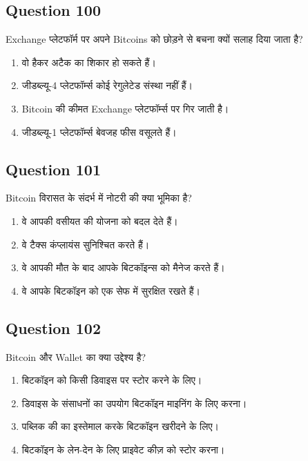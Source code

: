 \documentclass[12pt,a4paper]{article}
\begin{document}
\bigskip


\subsection*{Question 100}
Exchange प्लेटफॉर्म पर अपने Bitcoins को छोड़ने से बचना क्यों सलाह दिया जाता है?

\begin{enumerate}[label=\Alph*., leftmargin=*]
\item वो हैकर अटैक का शिकार हो सकते हैं।
\item जीडब्ल्यू-4 प्लेटफॉर्म्स कोई रेगुलेटेड संस्था नहीं हैं।
\item Bitcoin की कीमत Exchange प्लेटफॉर्म्स पर गिर जाती है।
\item जीडब्ल्यू-1 प्लेटफॉर्म्स बेवजह फीस वसूलते हैं।
\end{enumerate}

\bigskip


\subsection*{Question 101}
Bitcoin विरासत के संदर्भ में नोटरी की क्या भूमिका है?

\begin{enumerate}[label=\Alph*., leftmargin=*]
\item वे आपकी वसीयत की योजना को बदल देते हैं।
\item वे टैक्स कंप्लायंस सुनिश्चित करते हैं।
\item वे आपकी मौत के बाद आपके बिटकॉइन्स को मैनेज करते हैं।
\item वे आपके बिटकॉइन को एक सेफ में सुरक्षित रखते हैं।
\end{enumerate}

\bigskip


\subsection*{Question 102}
Bitcoin और Wallet का क्या उद्देश्य है?

\begin{enumerate}[label=\Alph*., leftmargin=*]
\item बिटकॉइन को किसी डिवाइस पर स्टोर करने के लिए।
\item डिवाइस के संसाधनों का उपयोग बिटकॉइन माइनिंग के लिए करना।
\item पब्लिक की का इस्तेमाल करके बिटकॉइन खरीदने के लिए।
\item बिटकॉइन के लेन-देन के लिए प्राइवेट कीज़ को स्टोर करना।
\end{enumerate}
\end{document}

